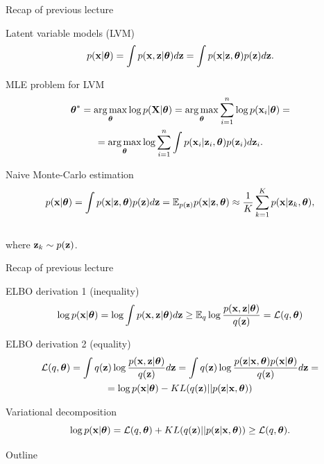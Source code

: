 \begin{frame}{Recap of previous lecture}
	\begin{block}{Latent variable models (LVM)}
		\vspace{-0.3cm}
		\[
		p(\mathbf{x} | \boldsymbol{\theta}) = \int p(\mathbf{x}, \mathbf{z} | \boldsymbol{\theta}) d\mathbf{z} = \int p(\mathbf{x} | \mathbf{z}, \boldsymbol{\theta}) p(\mathbf{z}) d\mathbf{z}.
		\]
	\end{block}
	\begin{block}{MLE problem for LVM}
		\vspace{-0.7cm}
		\begin{multline*}
			\boldsymbol{\theta}^* = \operatorname*{arg\,max}_{\boldsymbol{\theta}} \log p(\mathbf{X}| \boldsymbol{\theta}) = \operatorname*{arg\,max}_{\boldsymbol{\theta}} \sum_{i=1}^n \log p(\mathbf{x}_i | \boldsymbol{\theta}) = \\ = \operatorname*{arg\,max}_{\boldsymbol{\theta}} \log \sum_{i=1}^n \int p(\mathbf{x}_i| \mathbf{z}_i, \boldsymbol{\theta}) p(\mathbf{z}_i) d\mathbf{z}_i.
		\end{multline*}
		\vspace{-0.7cm}
	\end{block}
	\begin{block}{Naive Monte-Carlo estimation}
		\vspace{-0.7cm}
		\[
		p(\mathbf{x} | \boldsymbol{\theta}) = \int p(\mathbf{x} | \mathbf{z}, \boldsymbol{\theta}) p(\mathbf{z}) d\mathbf{z} = \mathbb{E}_{p(\mathbf{z})} p(\mathbf{x} | \mathbf{z}, \boldsymbol{\theta}) \approx \frac{1}{K} \sum_{k=1}^{K} p(\mathbf{x} | \mathbf{z}_k, \boldsymbol{\theta}),
		\]
		\vspace{-0.5cm} \\
		where $\mathbf{z}_k \sim p(\mathbf{z})$. 
	\end{block}
\end{frame}
\begin{frame}{Recap of previous lecture}
	\begin{block}{ELBO derivation 1 (inequality)}
		\vspace{-0.3cm}
		\begin{multline*}
			\log p(\mathbf{x}| \boldsymbol{\theta}) 
			= \log \int p(\mathbf{x}, \mathbf{z} | \boldsymbol{\theta}) d\mathbf{z} \geq \mathbb{E}_{q} \log \frac{p(\mathbf{x}, \mathbf{z}| \boldsymbol{\theta})}{q(\mathbf{z})} =  \mathcal{L}(q, \boldsymbol{\theta})
		\end{multline*}
		\vspace{-0.3cm}
	\end{block}
	\begin{block}{ELBO derivation 2 (equality)}
		\vspace{-0.3cm}
		\begin{multline*}
			\mathcal{L} (q, \boldsymbol{\theta}) = \int q(\mathbf{z}) \log \frac{p(\mathbf{x}, \mathbf{z} | \boldsymbol{\theta})}{q(\mathbf{z})}d\mathbf{z} = 
			\int q(\mathbf{z}) \log \frac{p(\mathbf{z}|\mathbf{x}, \boldsymbol{\theta})p(\mathbf{x}| \boldsymbol{\theta})}{q(\mathbf{z})}d\mathbf{z} = \\
			= \log p(\mathbf{x}| \boldsymbol{\theta}) - KL(q(\mathbf{z}) || p(\mathbf{z}|\mathbf{x}, \boldsymbol{\theta}))
		\end{multline*}
	\end{block}
	\vspace{-0.3cm}
	\begin{block}{Variational decomposition}
		\[
			\log p(\mathbf{x}| \boldsymbol{\theta}) = \mathcal{L} (q, \boldsymbol{\theta}) + KL(q(\mathbf{z}) || p(\mathbf{z}|\mathbf{x}, \boldsymbol{\theta})) \geq \mathcal{L} (q, \boldsymbol{\theta}).
		\]
	\end{block}
\end{frame}
\begin{frame}{Outline}
	\tableofcontents
\end{frame}
